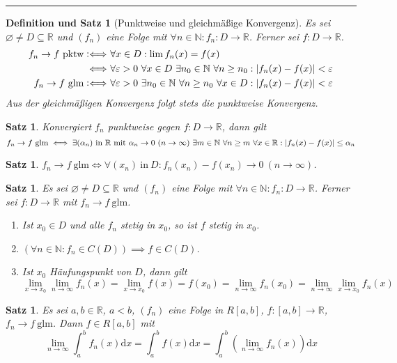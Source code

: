 \documentclass[a4paper]{article}
\newcounter{Sec}
\theoremstyle{marginbreak}
\newtheorem{satz}[definition]{Satz}
\newtheorem{defsatz}[definition]{Definition und Satz}
\newcommand{\sep}{%
	\rule{\textwidth}{0.3pt}%
	\stepcounter{Sec}%
	}
\newcommand{\defiff}{\mathrel{\vcentcolon\Longleftrightarrow}}
\newcommand{\en}{~(n\to\infty)}
\renewcommand{\d}[1]{\mathrm{d}#1}
\begin{document}
	\sep
	\begin{defsatz}[Punktweise und gleichmäßige Konvergenz]
		Es sei $\varnothing\neq D\subseteq\mathbb{R}$ und $(f_n)$ eine Folge mit
		$\forall n\in\mathbb{N}:f_n\colon D\to\mathbb{R}$. Ferner sei $f\colon D\to\mathbb{R}$.
		\begin{align*}
			f_n\to f~\text{pktw}
			\defiff&~\forall x\in D:\lim f_n(x)=f(x)\\
			\Longleftrightarrow&~\forall\varepsilon>0~\forall x\in D~\exists n_0\in\mathbb{N}~\forall n\geq n_0:\abs{f_n(x)-f(x)}<\varepsilon\\
			f_n\to f~\text{glm}
			\defiff&~\forall\varepsilon>0~\exists n_0\in\mathbb{N}~\forall n\geq n_0~\forall x\in D:\abs{f_n(x)-f(x)}<\varepsilon
		\end{align*}
		Aus der gleichmäßigen Konvergenz folgt stets die punktweise Konvergenz.
	\end{defsatz}
	\begin{satz}
		Konvergiert $f_n$ punktweise gegen $f\colon D\to\mathbb{R}$, dann gilt
		\[ f_n\to f~\text{glm}\iff\exists(\alpha_n)~\text{in $\mathbb{R}$ mit $\alpha_n\to0\en$}~\exists
		m\in\mathbb{N}~\forall n\geq m~\forall x\in\mathbb{R}:\abs{f_n(x)-f(x)}\leq\alpha_n\]
	\end{satz}
	\begin{satz}
		$f_n\to f~\text{glm}\iff\forall(x_n)~\text{in}~D:f_n(x_n)-f(x_n)\to0\en$.
	\end{satz}
	\begin{satz}
		Es sei $\varnothing\neq D\subseteq\mathbb{R}$ und $(f_n)$ eine Folge mit
		$\forall n\in\mathbb{N}:f_n\colon D\to\mathbb{R}$. Ferner sei $f\colon D\to\mathbb{R}$
		mit $f_n\to f~\text{glm}$.
		\begin{enumerate}[label=(\alph*)]
			\item Ist $x_0\in D$ und alle $f_n$ stetig in $x_0$, so ist $f$ stetig in $x_0$.
			\item $(\forall n\in\mathbb{N}: f_n\in C(D)) \implies f\in C(D)$.
			\item Ist $x_0$ Häufungspunkt von $D$, dann gilt
			\[ \lim_{x\to x_0}\lim_{n\to\infty}f_n(x)=\lim_{x\to x_0}f(x)=f(x_0)=\lim_{n\to\infty}f_n(x_0)=\lim_{n\to\infty}\lim_{x\to x_0}f_n(x) \]
		\end{enumerate}
	\end{satz}
	\begin{satz}
		Es sei $a,b\in\mathbb{R}$, $a<b$, $(f_n)$ eine Folge in $R[a,b]$,
		$f\colon[a,b]\to\mathbb{R}$, $f_n\to f~\text{glm}$. Dann $f\in R[a,b]$ mit
		\[ \lim_{n\to\infty}\int_a^bf_n(x)\d{x}=\int_a^bf(x)\d{x}=\int_a^b(\lim_{n\to\infty}f_n(x))\d{x} \]
	\end{satz}
\end{document}
